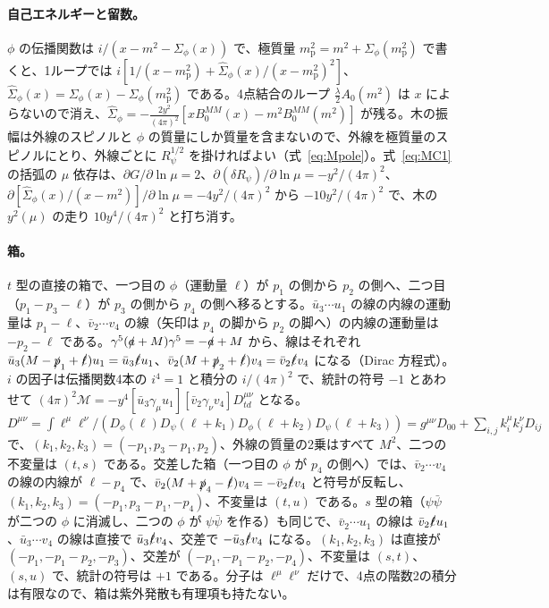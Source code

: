 \documentclass[a4paper,10pt]{ltjsarticle}
\begin{document}
\paragraph{自己エネルギーと留数。}$\phi$ の伝播関数は $i/(x-m^2-\Sigma_\phi(x))$ で、極質量 $m_{\mathrm p}^2=m^2+\Sigma_\phi(m_{\mathrm p}^2)$ で書くと、1ループでは $i[1/(x-m_{\mathrm p}^2)+\hat\Sigma_\phi(x)/(x-m_{\mathrm p}^2)^2]$、$\hat\Sigma_\phi(x)=\Sigma_\phi(x)-\Sigma_\phi(m_{\mathrm p}^2)$ である。4点結合のループ $\frac\lambda2A_0(m^2)$ は $x$ によらないので消え、$\hat\Sigma_\phi=-\frac{2y^2}{(4\pi)^2}[xB_0^{MM}(x)-m^2B_0^{MM}(m^2)]$ が残る。木の振幅は外線のスピノルと $\phi$ の質量にしか質量を含まないので、外線を極質量のスピノルにとり、外線ごとに $R_\psi^{1/2}$ を掛ければよい（式~\eqref{eq:Mpole}）。式~\eqref{eq:MC1} の括弧の $\mu$ 依存は、$\partial G/\partial\ln\mu=2$、$\partial(\delta R_\psi)/\partial\ln\mu=-y^2/(4\pi)^2$、$\partial[\hat\Sigma_\phi(x)/(x-m^2)]/\partial\ln\mu=-4y^2/(4\pi)^2$ から $-10y^2/(4\pi)^2$ で、木の $y^2(\mu)$ の走り $10y^4/(4\pi)^2$ と打ち消す。

\paragraph{箱。}$t$ 型の直接の箱で、一つ目の $\phi$（運動量 $\ell$）が $p_1$ の側から $p_2$ の側へ、二つ目（$p_1-p_3-\ell$）が $p_3$ の側から $p_4$ の側へ移るとする。$\bar u_3\cdots u_1$ の線の内線の運動量は $p_1-\ell$、$\bar v_2\cdots v_4$ の線（矢印は $p_4$ の脚から $p_2$ の脚へ）の内線の運動量は $-p_2-\ell$ である。$\gamma^5(\slashed a+M)\gamma^5=-\slashed a+M$ から、線はそれぞれ $\bar u_3(M-\slashed p_1+\slashed\ell)u_1=\bar u_3\slashed\ell u_1$、$\bar v_2(M+\slashed p_2+\slashed\ell)v_4=\bar v_2\slashed\ell v_4$ になる（Dirac 方程式）。$i$ の因子は伝播関数4本の $i^4=1$ と積分の $i/(4\pi)^2$ で、統計の符号 $-1$ とあわせて $(4\pi)^2\mathcal M=-y^4[\bar u_3\gamma_\mu u_1][\bar v_2\gamma_\nu v_4]D_{td}^{\mu\nu}$ となる。$D^{\mu\nu}=\int\ell^\mu\ell^\nu/(D_\phi(\ell)D_\psi(\ell+k_1)D_\phi(\ell+k_2)D_\psi(\ell+k_3))=g^{\mu\nu}D_{00}+\sum_{i,j}k_i^\mu k_j^\nu D_{ij}$ で、$(k_1,k_2,k_3)=(-p_1,p_3-p_1,p_2)$、外線の質量の2乗はすべて $M^2$、二つの不変量は $(t,s)$ である。交差した箱（一つ目の $\phi$ が $p_4$ の側へ）では、$\bar v_2\cdots v_4$ の線の内線が $\ell-p_4$ で、$\bar v_2(M+\slashed p_4-\slashed\ell)v_4=-\bar v_2\slashed\ell v_4$ と符号が反転し、$(k_1,k_2,k_3)=(-p_1,p_3-p_1,-p_4)$、不変量は $(t,u)$ である。$s$ 型の箱（$\psi\bar\psi$ が二つの $\phi$ に消滅し、二つの $\phi$ が $\psi\bar\psi$ を作る）も同じで、$\bar v_2\cdots u_1$ の線は $\bar v_2\slashed\ell u_1$、$\bar u_3\cdots v_4$ の線は直接で $\bar u_3\slashed\ell v_4$、交差で $-\bar u_3\slashed\ell v_4$ になる。$(k_1,k_2,k_3)$ は直接が $(-p_1,-p_1-p_2,-p_3)$、交差が $(-p_1,-p_1-p_2,-p_4)$、不変量は $(s,t)$、$(s,u)$ で、統計の符号は $+1$ である。分子は $\ell^\mu\ell^\nu$ だけで、4点の階数2の積分は有限なので、箱は紫外発散も有理項も持たない。
\end{document}
